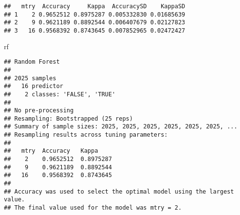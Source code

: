 \documentclass[]{article}
\newenvironment{Shaded}{\begin{snugshade}}{\end{snugshade}}
\newcommand{\DataTypeTok}[1]{\textcolor[rgb]{0.13,0.29,0.53}{#1}}
\newcommand{\DecValTok}[1]{\textcolor[rgb]{0.00,0.00,0.81}{#1}}
\newcommand{\KeywordTok}[1]{\textcolor[rgb]{0.13,0.29,0.53}{\textbf{#1}}}
\newcommand{\NormalTok}[1]{#1}
\newcommand{\OperatorTok}[1]{\textcolor[rgb]{0.81,0.36,0.00}{\textbf{#1}}}
\newcommand{\StringTok}[1]{\textcolor[rgb]{0.31,0.60,0.02}{#1}}
\begin{document}
\begin{verbatim}
##   mtry  Accuracy     Kappa  AccuracySD    KappaSD
## 1    2 0.9652512 0.8975287 0.005332830 0.01685639
## 2    9 0.9621189 0.8892544 0.006407679 0.02127823
## 3   16 0.9568392 0.8743645 0.007852965 0.02472427
\end{verbatim}

\begin{Shaded}
\begin{Highlighting}[]
\NormalTok{rf}
\end{Highlighting}
\end{Shaded}

\begin{verbatim}
## Random Forest 
## 
## 2025 samples
##   16 predictor
##    2 classes: 'FALSE', 'TRUE' 
## 
## No pre-processing
## Resampling: Bootstrapped (25 reps) 
## Summary of sample sizes: 2025, 2025, 2025, 2025, 2025, 2025, ... 
## Resampling results across tuning parameters:
## 
##   mtry  Accuracy   Kappa    
##    2    0.9652512  0.8975287
##    9    0.9621189  0.8892544
##   16    0.9568392  0.8743645
## 
## Accuracy was used to select the optimal model using the largest value.
## The final value used for the model was mtry = 2.
\end{verbatim}

\begin{Shaded}
\end{Shaded}
\end{document}
